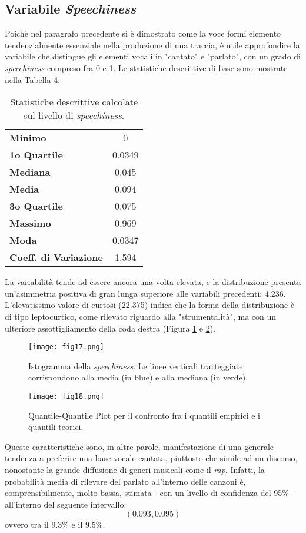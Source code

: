 \documentclass[fleqn,10pt]{SelfArx} %
\begin{document}
\subsection*{Variabile \textit{Speechiness}}
Poichè nel paragrafo precedente si è dimostrato come la voce formi elemento tendenzialmente essenziale nella produzione di una traccia, è utile approfondire la variabile che distingue gli elementi vocali in "cantato" e "parlato", con un grado di \textit{speechiness} compreso fra 0 e 1. Le statistiche descrittive di base sono mostrate nella Tabella 4:
{\begin{table}[H]
\centering

\begin{tabular}[t]{lc}
\toprule
\midrule
\textbf{Minimo}&0\\
\textbf{1o Quartile}&0.0349\\
\textbf{Mediana}&0.045\\
\textbf{Media}&0.094\\
\textbf{3o Quartile}&0.075\\
\textbf{Massimo}&0.969\\
\textbf{Moda}&0.0347\\
\textbf{Coeff. di Variazione}&1.594\\
\bottomrule
\end{tabular}
\caption{Statistiche descrittive calcolate sul livello di \textit{speechiness}.}
\end{table}}
La variabilità tende ad essere ancora una volta elevata, e la distribuzione presenta un'asimmetria positiva di gran lunga superiore alle variabili precedenti: 4.236. L'elevatissimo valore di curtosi (22.375) indica che la forma della distribuzione è di tipo leptocurtico, come rilevato riguardo alla "strumentalità", ma con un ulteriore assottigliamento della coda destra (Figura \ref{fig:fig17} e \ref{fig:fig18}).
\begin{figure}[H]
    \centering
    \texttt{[image: fig17.png]}
    \label{fig:fig17}
    \caption{Istogramma della \textit{speechiness}. Le linee verticali tratteggiate corrispondono alla media (in blue) e alla mediana (in verde).}
\end{figure}
\begin{figure}[H]
    \centering
    \texttt{[image: fig18.png]}
    \label{fig:fig18}
    \caption{Quantile-Quantile Plot per il confronto fra i quantili empirici e i quantili teorici.}
\end{figure}
Queste caratteristiche sono, in altre parole, manifestazione di una generale tendenza a preferire una base vocale cantata, piuttosto che simile ad un discorso, nonostante la grande diffusione di generi musicali come il \textit{rap}. Infatti, la probabilità media di rilevare del parlato all'interno delle canzoni è, comprensibilmente, molto bassa, stimata - con un livello di confidenza del 95\% - all'interno del seguente intervallo:
\begin{equation}
    (0.093, 0.095)
\end{equation}
ovvero tra il 9.3\% e il 9.5\%.
\end{document}
